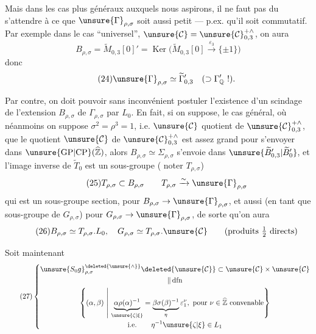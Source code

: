 
Mais dans les cas plus généraux auxquels nous aspirons, il ne faut pas du  s'attendre à ce que $\unsure{\Gamma}_{\rho,\sigma}$ soit aussi petit --- p.ex. qu'il soit commutatif.
Par exemple dans le cas ``universel'', $\unsure{\mathcal{C}}=\unsure{\mathcal{C}}_{0,3}^{+\wedge}$, on aura
\[
\tag{23}
B_{\rho,\sigma}=\widetilde{M}_{0,3}[0]'=
\operatorname{Ker}\bigl(\widetilde{M}_{0,3}[0]\xrightarrow{\varepsilon_3}\{\pm1\}\bigr)
\]
donc
\[
\tag{24}
\unsure{\Gamma}_{\rho,\sigma}\simeq\widetilde{\Gamma}_{0,3}'
\quad(\supset\Gamma_{\mathbb{Q}}'\ !).
\]

Par contre, on doit pouvoir sans inconvénient postuler l'existence d'un scindage  de l'extension $B_{\rho,\sigma}$ de $\Gamma_{\rho,\sigma}$ par $L_0$.
En fait, si on suppose,  
 le cas général, où néanmoins on suppose $\sigma^2=\rho^3=1$, i.e. $\unsure{\mathcal{C}}$ quotient de $\unsure{\mathcal{C}}_{0,3}^{+\wedge}$, que le quotient $\unsure{\mathcal{C}}$ de $\unsure{\mathcal{C}}_{0,3}^{+\wedge}$ est assez grand pour s'envoyer dans $\unsure{\mathrm{GP}|\mathrm{CP}}(\widehat{\mathbb{Z}})$, alors  $B_{\rho,\sigma}\simeq\Sigma_{\rho,\sigma}$ s'envoie dans $\unsure{\widetilde{B}'_{0,3}|\widetilde{B}'_{0}}$, et l'image inverse de $\widetilde{T}_0$ est un sous-groupe ( noter $T_{\rho,\sigma}$)
\[
\tag{25}
T_{\rho,\sigma}\subset B_{\rho,\sigma}\qquad
T_{\rho,\sigma}\xrightarrow{\sim}\unsure{\Gamma}_{\rho,\sigma}
\]
qui est un sous-groupe section, pour $B_{\rho,\sigma}\to\unsure{\Gamma}_{\rho,\sigma}$, et aussi (en tant que sous-groupe de $G_{\rho,\sigma}$) pour $G_{\rho,\sigma}\to\unsure{\Gamma}_{\rho,\sigma}$, de sorte qu'on aura
\[
\tag{26}
B_{\rho,\sigma}\simeq T_{\rho,\sigma}.L_0,\quad
G_{\rho,\sigma}\simeq T_{\rho,\sigma}.\unsure{\mathcal{C}}
\qquad\text{(produits $\tfrac12$ directs)}
\]


Soit maintenant
\[
\tag{27}
\left\{
\begin{gathered}
\unsure{S_0g}_{\rho,\sigma}^{\deleted{\unsure{\wedge}}}
\deleted{\unsure{\mathcal{C}}}\subset
\unsure{\mathcal{C}}\times\unsure{\mathcal{C}}
\\[-0.3ex]
\Vert\,\mathrm{dfn}
\\
\left\{(\alpha,\beta)\ \middle|\
\underbrace{\alpha\rho(\alpha)^{-1}}_{\unsure{\zeta|\xi}}
=\underbrace{\beta\sigma(\beta)^{-1}}_{\eta}\varepsilon_1^\nu,
\ \text{pour }\nu\in\widehat{\mathbb{Z}}\ \text{convenable}\right\}
\\[-0.3ex]
\text{i.e.}\qquad \eta^{-1}\unsure{\zeta|\xi}\in L_1
\end{gathered}
\right.
\]

